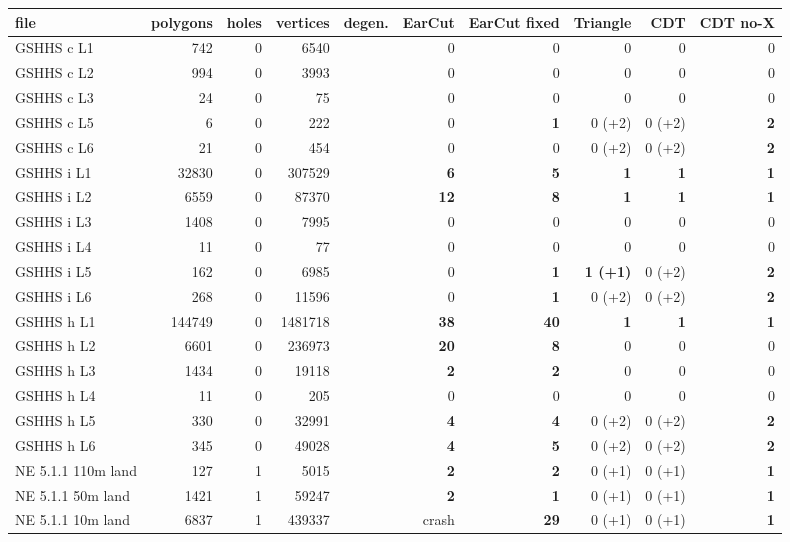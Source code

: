 \begin{tabular}{lrrrrrrrrr}
\toprule
file & polygons & holes & vertices & degen. & EarCut & EarCut fixed & Triangle & CDT & CDT no-X \\
\midrule
GSHHS c L1 & 742 & 0 & 6540 &  & 0 & 0 & 0 & 0 & 0 \\
GSHHS c L2 & 994 & 0 & 3993 &  & 0 & 0 & 0 & 0 & 0 \\
GSHHS c L3 & 24 & 0 & 75 &  & 0 & 0 & 0 & 0 & 0 \\
GSHHS c L5 & 6 & 0 & 222 &  & 0 & \textbf{1} & 0 (+2) & 0 (+2) & \textbf{2} \\
GSHHS c L6 & 21 & 0 & 454 &  & 0 & 0 & 0 (+2) & 0 (+2) & \textbf{2} \\
\midrule
GSHHS i L1 & 32830 & 0 & 307529 &  & \textbf{6} & \textbf{5} & \textbf{1} & \textbf{1} & \textbf{1} \\
GSHHS i L2 & 6559 & 0 & 87370 &  & \textbf{12} & \textbf{8} & \textbf{1} & \textbf{1} & \textbf{1} \\
GSHHS i L3 & 1408 & 0 & 7995 &  & 0 & 0 & 0 & 0 & 0 \\
GSHHS i L4 & 11 & 0 & 77 &  & 0 & 0 & 0 & 0 & 0 \\
GSHHS i L5 & 162 & 0 & 6985 &  & 0 & \textbf{1} & \textbf{1 (+1)} & 0 (+2) & \textbf{2} \\
GSHHS i L6 & 268 & 0 & 11596 &  & 0 & \textbf{1} & 0 (+2) & 0 (+2) & \textbf{2} \\
\midrule
GSHHS h L1 & 144749 & 0 & 1481718 &  & \textbf{38} & \textbf{40} & \textbf{1} & \textbf{1} & \textbf{1} \\
GSHHS h L2 & 6601 & 0 & 236973 &  & \textbf{20} & \textbf{8} & 0 & 0 & 0 \\
GSHHS h L3 & 1434 & 0 & 19118 &  & \textbf{2} & \textbf{2} & 0 & 0 & 0 \\
GSHHS h L4 & 11 & 0 & 205 &  & 0 & 0 & 0 & 0 & 0 \\
GSHHS h L5 & 330 & 0 & 32991 &  & \textbf{4} & \textbf{4} & 0 (+2) & 0 (+2) & \textbf{2} \\
GSHHS h L6 & 345 & 0 & 49028 &  & \textbf{4} & \textbf{5} & 0 (+2) & 0 (+2) & \textbf{2} \\
\midrule
NE 5.1.1 110m land & 127 & 1 & 5015 &  & \textbf{2} & \textbf{2} & 0 (+1) & 0 (+1) & \textbf{1} \\
NE 5.1.1 50m land & 1421 & 1 & 59247 &  & \textbf{2} & \textbf{1} & 0 (+1) & 0 (+1) & \textbf{1} \\
NE 5.1.1 10m land & 6837 & 1 & 439337 &  & crash & \textbf{29} & 0 (+1) & 0 (+1) & \textbf{1} \\

\end{tabular}
